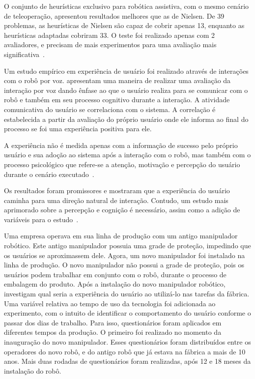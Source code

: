O conjunto de heurísticas exclusivo para robótica assistiva, com o mesmo cenário de teleoperação, apresentou resultados melhores que as de Nielsen. De 39 problemas, as heurísticas de Nielsen são capaz de cobrir apenas 13, enquanto as heurísticas adaptadas cobriram 33. O teste foi realizado apenas com 2 avaliadores, e precisam de mais experimentos para uma avaliação mais significativa~\cite{tsui:2010}.

Um estudo empírico em experiência de usuário foi realizado através de interações com o robô por voz. \textcite{jokinen:2013} apresentam uma maneira de realizar uma avaliação da interação por voz dando ênfase ao que o usuário realiza para se comunicar com o robô e também em seu processo cognitivo durante a interação. A atividade comunicativa do usuário se correlaciona com o sistema. A correlação é estabelecida a partir da avaliação do próprio usuário onde ele informa ao final do processo se foi uma experiência positiva para ele.

A experiência não é medida apenas com a informação de sucesso pelo próprio usuário e sua adoção ao sistema após a interação com o robô, mas também com o processo psicológico que refere-se a atenção, motivação e percepção do usuário durante o cenário executado~\cite{jokinen:2013}.

Os resultados foram promissores e mostraram que a experiência do usuário caminha para uma direção natural de interação. Contudo, um estudo mais aprimorado sobre a percepção e cognição é necessário, assim como a adição de variáveis para o estudo~\cite{jokinen:2013}.

Uma empresa operava em sua linha de produção com um antigo manipulador robótico. Este antigo manipulador possuia uma grade de proteção, impedindo que os usuários se aproximassem dele. Agora, um novo manipulador foi instalado na linha de produção. O novo manipulador não possui a grade de proteção, pois os usuários podem trabalhar em conjunto com o robô, durante o processo de embalagem do produto. Após a instalação do novo manipulador robótico, \textcite{buchner:2013} investigam qual seria a experiência do usuário ao utilizá-lo nas tarefas da fábrica. Uma variável relativa ao tempo de uso da tecnologia foi adicionada ao experimento, com o intuito de identificar o comportamento do usuário conforme o passar dos dias de trabalho. Para isso, questionários foram aplicados em diferentes tempos da produção. O primeiro foi realizado no momento da inauguração do novo manipulador. Esses questionários foram distribuídos entre os operadores do novo robô, e do antigo robô que já estava na fábrica a mais de 10 anos. Mais duas rodadas de questionários foram realizadas, após 12 e 18 meses da instalação do robô.

